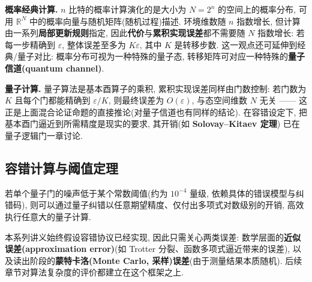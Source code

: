 \documentclass[utf8]{article} %
\numberwithin{equation}{section}   %
\newtheorem{Thm}{\hskip 2em {\color{blue} 定理}}[subsection]
\newtheorem{Note}{\hskip 2em {\color{red} 注}}[subsection]
\begin{document}
\textbf{概率经典计算.} $n$ 比特的概率计算演化的是大小为 $N = 2^n$ 的空间上的概率分布,
可用 $\mathbb{R}^N$ 中的概率向量与随机矩阵(随机过程)描述. 环境维数随 $n$ 指数增长,
但计算由一系列\textbf{局部更新规则}指定, 因此\textbf{代价}与\textbf{累积实现误差}都不需要随 $N$
指数增长: 若每一步精确到 $\varepsilon$, 整体误差至多为 $K\varepsilon$, 其中 $K$ 是转移步数.
这一观点还可延伸到经典/量子对比: 概率分布可视为一种特殊的量子态, 转移矩阵可对应一种特殊的\textbf{量子信道(quantum channel)}.

\textbf{量子计算.} 量子算法是基本酉算子的乘积, 累积实现误差同样由门数控制: 若门数为 $K$
且每个门都能精确到 $\varepsilon/K$, 则最终误差为 $O(\varepsilon)$, 与态空间维数 $N$ 无关 ——
这正是上面混合论证命题的直接推论(对量子信道也有同样的结论).
在容错设定下, 把基本酉门逼近到所需精度是现实的要求, 其开销(如 \textbf{Solovay–Kitaev 定理})
已在量子逻辑门一章讨论.

\subsection{容错计算与阈值定理}

\begin{Thm}[阈值定理]
    若单个量子门的噪声低于某个常数阈值(约为 $10^{-4}$ 量级, 依赖具体的错误模型与纠错码),
    则可以通过量子纠错以任意期望精度、仅付出多项式对数级别的开销, 高效执行任意大的量子计算.
\end{Thm}

\begin{Note}
    本系列讲义始终假设容错协议已经实现, 因此只需关心两类误差:
    数学层面的\textbf{近似误差(approximation error)}(如 Trotter 分裂、函数多项式逼近带来的误差),
    以及读出阶段的\textbf{蒙特卡洛(Monte Carlo, 采样)误差}(由于测量结果本质随机).
    后续章节对算法复杂度的评价都建立在这个框架之上.
\end{Note}
\end{document}
